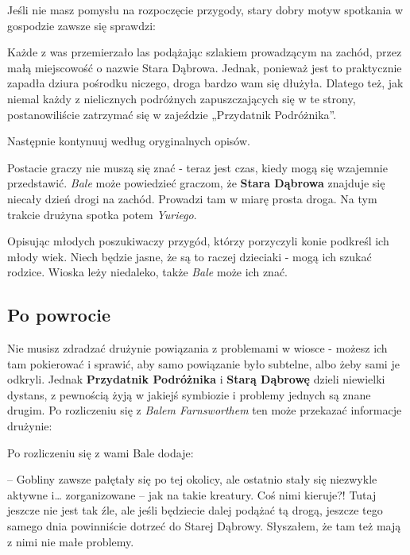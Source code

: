 \begin{twocolumn}
Jeśli nie masz pomysłu na rozpoczęcie przygody, stary dobry motyw spotkania w gospodzie zawsze się sprawdzi:

\begin{DndReadAloud}
Każde z was przemierzało las podążając szlakiem prowadzącym na zachód, przez małą miejscowość o nazwie Stara Dąbrowa.
Jednak, ponieważ jest to praktycznie zapadła dziura pośrodku niczego, droga bardzo wam się dłużyła. Dlatego też, jak
niemal każdy z nielicznych podróżnych zapuszczających się w te strony, postanowiliście zatrzymać się w zajeździe
„Przydatnik Podróżnika”.
\end{DndReadAloud}

Następnie kontynuuj według oryginalnych opisów.

Postacie graczy nie muszą się znać - teraz jest czas, kiedy mogą się wzajemnie przedstawić. \emph{Bale} może powiedzieć
graczom, że \textbf{Stara Dąbrowa} znajduje się niecały dzień drogi na zachód. Prowadzi tam w miarę prosta droga. Na tym
trakcie drużyna spotka potem \emph{Yuriego}.

Opisując młodych poszukiwaczy przygód, którzy porzyczyli konie podkreśl ich młody wiek. Niech będzie jasne, że są to
raczej dzieciaki - mogą ich szukać rodzice. Wioska leży niedaleko, także \emph{Bale} może ich znać.

\subsection{Po powrocie}

Nie musisz zdradzać drużynie powiązania z problemami w wiosce - możesz ich tam pokierować i sprawić, aby samo powiązanie
było subtelne, albo żeby sami je odkryli. Jednak \textbf{Przydatnik Podróżnika} i \textbf{Starą Dąbrowę} dzieli
niewielki dystans, z pewnością żyją w jakiejś symbiozie i problemy jednych są znane drugim. Po rozliczeniu się z
\emph{Balem Farnsworthem} ten może przekazać informacje drużynie:

\begin{DndReadAloud}
Po rozliczeniu się z wami Bale dodaje:

– Gobliny zawsze pałętały się po tej okolicy, ale ostatnio stały się niezwykle aktywne i… zorganizowane – jak na takie
kreatury. Coś nimi kieruje?! Tutaj jeszcze nie jest tak źle, ale jeśli będziecie dalej podążać tą drogą, jeszcze tego
samego dnia powinniście dotrzeć do Starej Dąbrowy. Słyszałem, że tam też mają z nimi nie małe problemy.
\end{DndReadAloud}


\end{twocolumn}
